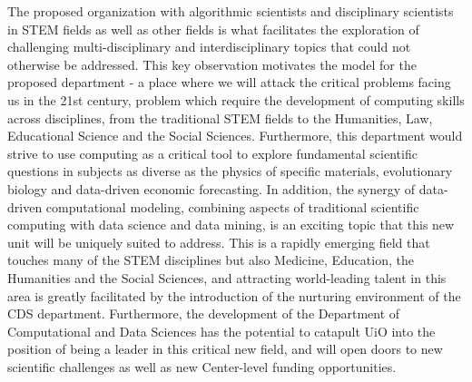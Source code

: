 \documentclass[%
oneside,                 %
final,                   %
10pt]{article}
\begin{document}
The proposed organization with  algorithmic scientists and disciplinary scientists in STEM fields as well as other  fields is what facilitates the exploration of challenging multi-disciplinary and
interdisciplinary topics that could not otherwise be addressed. This key observation motivates
the model for the proposed department - a place where we will attack the critical problems
facing us in the 21st century, problem which require the development of computing skills across disciplines, from the traditional STEM fields to the Humanities, Law, Educational Science  and the Social Sciences. 
Furthermore, this department would strive to use
computing as a critical tool to explore fundamental scientific questions in subjects as diverse as
the physics of specific materials, evolutionary biology and data-driven economic forecasting. In addition, the synergy of data-driven computational
modeling, combining aspects of traditional scientific computing with data science and data
mining, is an exciting topic that this new unit will be uniquely suited to address. This is a rapidly
emerging field that touches many of the STEM disciplines but also Medicine, Education, the Humanities and the Social Sciences, and attracting world-leading talent in
this area is greatly facilitated by the introduction of the nurturing environment of the CDS department. Furthermore, the development of the Department of Computational and Data Sciences
has the potential to  catapult UiO into the position of being a
leader in this critical new field, and will open doors to new scientific challenges as well
as new Center-level funding opportunities.
\end{document}
